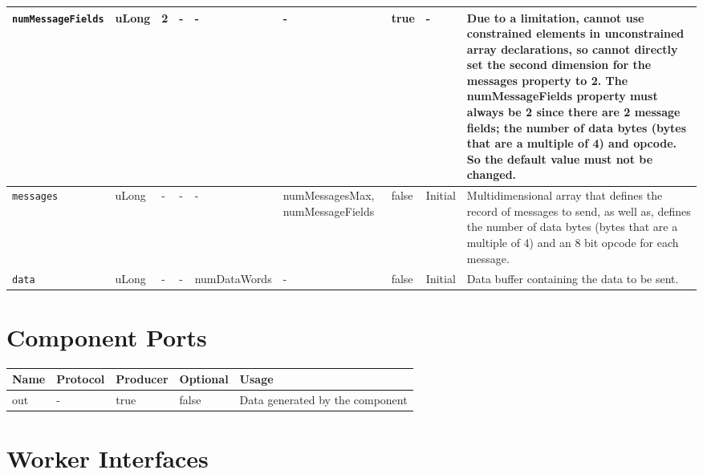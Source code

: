 \begin{landscape}
\begin{flushleft}
\begin{scriptsize}
\begin{tabular}{|p{2.5cm}|p{1cm}|p{1.5cm}|p{2cm}|p{2cm}|p{2.5cm}|p{1.5cm}|p{1.5cm}|p{5.5cm}|}
                \hline
                \verb+numMessageFields+ & uLong & 2 & - & - & - & true & - & Due to a limitation, cannot use constrained elements in unconstrained array declarations, so cannot directly set the second dimension for the messages property to 2. The numMessageFields property must always be 2 since there are 2 message fields; the number of data bytes (bytes that are a multiple of 4) and opcode. So the default value must not be changed.  \\
                \hline
                \verb+messages+ & uLong & - & - & - & numMessagesMax, numMessageFields & false & Initial & Multidimensional array that defines the record of messages to send, as well as, defines the number of data bytes (bytes that are a multiple of 4) and an 8 bit opcode for each message.\\
                \hline
                \verb+data+ & uLong & - & - & numDataWords & - & false & Initial & Data buffer containing the data to be sent.\\
                \hline
        \end{tabular}
        \end{scriptsize}


\end{flushleft}


\section*{Component Ports}

        \begin{scriptsize}
                \begin{tabular}{|M{2.5cm}|M{2cm}|M{2cm}|M{2.5cm}|M{12.5cm}|}
                        \hline
                        Name & Protocol & Producer & Optional & Usage\\
                        \hline
                        out
                        & -
                        & true
                        & false
                        & Data generated by the component \\
                        \hline
                \end{tabular}
			\end{scriptsize}

\section*{Worker Interfaces}

\end{landscape}
